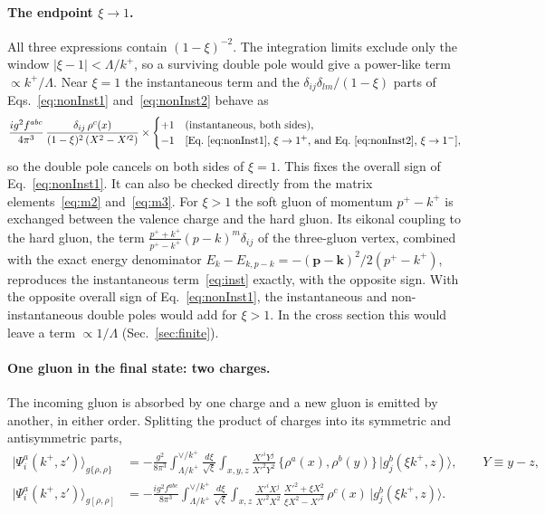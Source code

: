 \paragraph*{The endpoint $\xi\to1$.} All three expressions contain $(1-\xi)^{-2}$. The integration limits exclude only the window $|\xi-1|<\Lambda/k^+$, so a surviving double pole would give a power-like term $\propto k^+/\Lambda$. Near $\xi=1$ the instantaneous term and the $\delta_{ij}\delta_{lm}/(1-\xi)$ parts of Eqs.~\eqref{eq:nonInst1} and~\eqref{eq:nonInst2} behave as
\begin{equation}
\frac{ig^2f^{abc}}{4\pi^3}\,\frac{\delta_{ij}\,\rho^c(x)}{(1-\xi)^2\,(X^2-X'^2)}\times
\begin{cases}+1&\text{(instantaneous, both sides)},\\ -1&\text{[Eq.~\eqref{eq:nonInst1}, $\xi\to1^+$, and Eq.~\eqref{eq:nonInst2}, $\xi\to1^-$]},\end{cases}
\label{eq:endpoint}
\end{equation}
so the double pole cancels on both sides of $\xi=1$. This fixes the overall sign of Eq.~\eqref{eq:nonInst1}. It can also be checked directly from the matrix elements~\eqref{eq:m2} and~\eqref{eq:m3}. For $\xi>1$ the soft gluon of momentum $p^+-k^+$ is exchanged between the valence charge and the hard gluon. Its eikonal coupling to the hard gluon, the term $\frac{p^++k^+}{p^+-k^+}(p-k)^m\delta_{ij}$ of the three-gluon vertex, combined with the exact energy denominator $E_k-E_{k,p-k}=-(\mathbf p-\mathbf k)^2/2(p^+-k^+)$, reproduces the instantaneous term~\eqref{eq:inst} exactly, with the opposite sign. With the opposite overall sign of Eq.~\eqref{eq:nonInst1}, the instantaneous and non-instantaneous double poles would add for $\xi>1$. In the cross section this would leave a term $\propto1/\Lambda$ (Sec.~\ref{sec:finite}).

\paragraph*{One gluon in the final state: two charges.} The incoming gluon is absorbed by one charge and a new gluon is emitted by another, in either order. Splitting the product of charges into its symmetric and antisymmetric parts,
\begin{align}
|\Psi^a_i(k^+,z')\rangle_{g\{\rho,\rho\}}&=-\frac{g^2}{8\pi^3}\int_{\Lambda/k^+}^{\vee/k^+}\frac{d\xi}{\sqrt\xi}\int_{x,y,z}\frac{X'^iY^j}{X'^2Y^2}\,\{\rho^a(x),\rho^b(y)\}\,|g^b_j(\xi k^+,z)\rangle,\qquad Y\equiv y-z,\label{eq:g2rhoS}\\
|\Psi^a_i(k^+,z')\rangle_{g[\rho,\rho]}&=-\frac{ig^2f^{abc}}{8\pi^3}\int_{\Lambda/k^+}^{\vee/k^+}\frac{d\xi}{\sqrt\xi}\int_{x,z}\frac{X'^iX^j}{X'^2X^2}\,\frac{X'^2+\xi X^2}{\xi X^2-X'^2}\,\rho^c(x)\,|g^b_j(\xi k^+,z)\rangle .\label{eq:g2rhoA}
\end{align}

